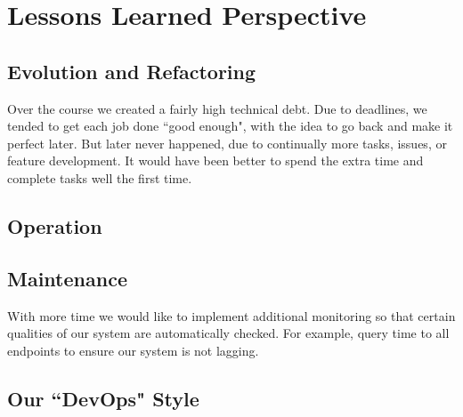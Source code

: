 \section{Lessons Learned Perspective}



\subsection{Evolution and Refactoring}
Over the course we created a fairly high technical debt. Due to deadlines, we tended to get each job done ``good enough", with the idea to go back and make it perfect later. But later never happened, due to continually more tasks, issues, or feature development. It would have been better to spend the extra time and complete tasks well the first time.

\subsection{Operation}


\subsection{Maintenance}

With more time we would like to implement additional monitoring so that certain qualities of our system are automatically checked. For example, query time to all endpoints to ensure our system is not lagging.


\subsection{Our ``DevOps" Style}

